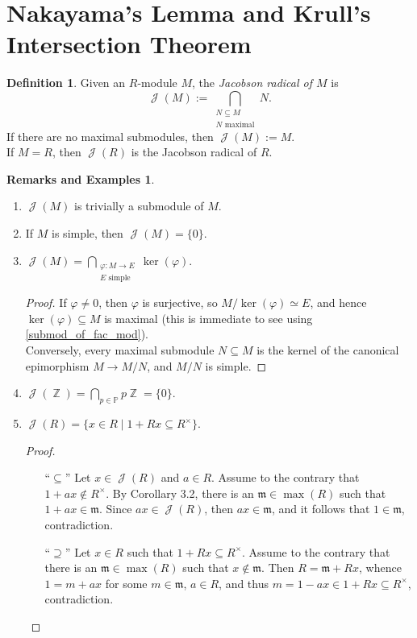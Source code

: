 \documentclass[12pt,a4paper]{report}
\theoremstyle{definition}
\newtheorem{defn}[theorem]{Definition}
\newtheorem*{remex}{Remarks and Examples}
\theoremstyle{num.custom-title}
\DeclareMathOperator{\J}{\mathcal{J}}
\DeclareMathOperator{\Z}{\mathbb{Z}}
\DeclareMathOperator{\sse}{\subseteq}
\newcommand{\m}{\mathfrak{m}}
\renewcommand{\phi}{\varphi}
\renewcommand{\P}{\mathbb{P}}
\begin{document}
\section{Nakayama's Lemma and Krull's Intersection Theorem}

\begin{defn}
Given an $R$-module $M$, the \emph{Jacobson radical of $M$} is
\[
\J(M):= \bigcap_{\substack{N \sse M \\ N \text{ maximal}}} N.
\]
If there are no maximal submodules, then $\J(M):=M$.\\
If $M=R$, then $\J(R)$ is the Jacobson radical of $R$.
\end{defn}

\begin{remex}\ 
\begin{enumerate}
\item $\J(M)$ is trivially a submodule of $M$.
\item If $M$ is simple, then $\J(M)= \{0\}$.
\item $\J(M) = \displaystyle\bigcap_{\substack{\phi : M \to E \\ E \text{ simple}}} \ker (\phi)$.
\begin{proof}
If $\phi \neq 0$, then $\phi$ is surjective, so $M/\ker(\phi) \simeq E$, and hence $\ker(\phi) \sse M$ is maximal (this is immediate to see using \ref{submod_of_fac_mod}).\\
Conversely, every maximal submodule $N \sse M$ is the kernel of the canonical epimorphism $M \to M/N$, and $M/N$ is simple.
\end{proof}
\item $\J(\Z) = \displaystyle\bigcap_{p \in \P} p\Z = \{0\}$.
\item $\J(R) = \{ x \in R \mid 1+Rx \sse R^\times \}$.
\begin{proof}\ 
\begin{itemize}
\item[``$\sse$''] Let $x \in \J(R)$ and $a \in R$. Assume to the contrary that $1+ax \not\in R^\times$. By Corollary 3.2, there is an $\m \in \max(R)$ such that $1+ax \in \m$. Since $ax \in \J(R)$, then $ax \in \m$, and it follows that $1 \in \m$, contradiction.
\item[``$\supseteq$''] Let $x \in R$ such that $1+Rx \sse R^\times$. Assume to the contrary that there is an $\m \in \max(R)$ such that $x \not\in \m$. Then $R=\m+Rx$, whence $1=m+ax$ for some $m \in \m$, $a \in R$, and thus $m = 1-ax \in 1+Rx \sse R^\times$, contradiction.
\end{itemize}
\end{proof}
\end{enumerate}
\end{remex}
\end{document}
